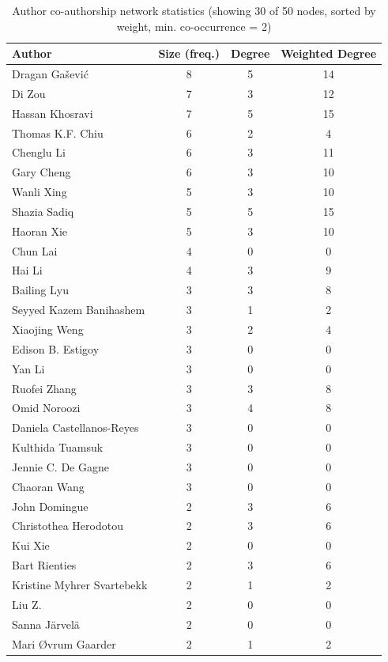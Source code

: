 \begin{table}[htbp]
\centering
\caption{Author co-authorship network statistics (showing 30 of 50 nodes, sorted by weight, min. co-occurrence = 2)}
\label{tab:author_cooccurrence_network_node_stats}
\begin{tabular}{p{6cm}ccc}
\toprule
Author & Size (freq.) & Degree & Weighted Degree \\
\midrule
\rowcolor{white}
Dragan Gašević & 8 & 5 & 14 \\
\rowcolor{gray!15}
Di Zou & 7 & 3 & 12 \\
\rowcolor{white}
Hassan Khosravi & 7 & 5 & 15 \\
\rowcolor{gray!15}
Thomas K.F. Chiu & 6 & 2 & 4 \\
\rowcolor{white}
Chenglu Li & 6 & 3 & 11 \\
\rowcolor{gray!15}
Gary Cheng & 6 & 3 & 10 \\
\rowcolor{white}
Wanli Xing & 5 & 3 & 10 \\
\rowcolor{gray!15}
Shazia Sadiq & 5 & 5 & 15 \\
\rowcolor{white}
Haoran Xie & 5 & 3 & 10 \\
\rowcolor{gray!15}
Chun Lai & 4 & 0 & 0 \\
\rowcolor{white}
Hai Li & 4 & 3 & 9 \\
\rowcolor{gray!15}
Bailing Lyu & 3 & 3 & 8 \\
\rowcolor{white}
Seyyed Kazem Banihashem & 3 & 1 & 2 \\
\rowcolor{gray!15}
Xiaojing Weng & 3 & 2 & 4 \\
\rowcolor{white}
Edison B. Estigoy & 3 & 0 & 0 \\
\rowcolor{gray!15}
Yan Li & 3 & 0 & 0 \\
\rowcolor{white}
Ruofei Zhang & 3 & 3 & 8 \\
\rowcolor{gray!15}
Omid Noroozi & 3 & 4 & 8 \\
\rowcolor{white}
Daniela Castellanos-Reyes & 3 & 0 & 0 \\
\rowcolor{gray!15}
Kulthida Tuamsuk & 3 & 0 & 0 \\
\rowcolor{white}
Jennie C. De Gagne & 3 & 0 & 0 \\
\rowcolor{gray!15}
Chaoran Wang & 3 & 0 & 0 \\
\rowcolor{white}
John Domingue & 2 & 3 & 6 \\
\rowcolor{gray!15}
Christothea Herodotou & 2 & 3 & 6 \\
\rowcolor{white}
Kui Xie & 2 & 0 & 0 \\
\rowcolor{gray!15}
Bart Rienties & 2 & 3 & 6 \\
\rowcolor{white}
Kristine Myhrer Svartebekk & 2 & 1 & 2 \\
\rowcolor{gray!15}
Liu Z. & 2 & 0 & 0 \\
\rowcolor{white}
Sanna Järvelä & 2 & 0 & 0 \\
\rowcolor{gray!15}
Mari Øvrum Gaarder & 2 & 1 & 2 \\
\bottomrule
\end{tabular}
\end{table}